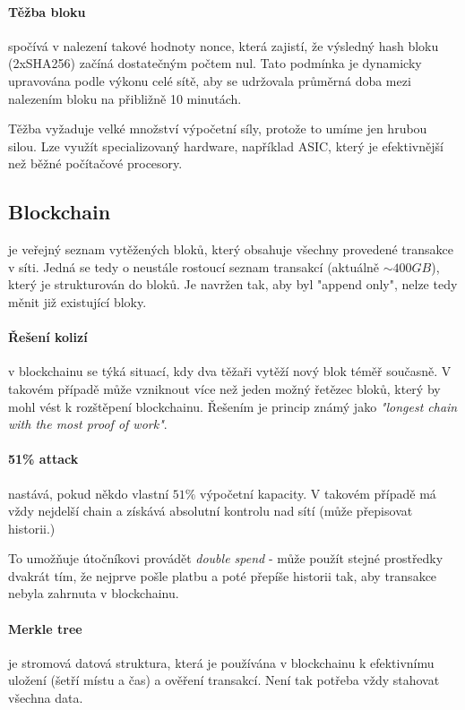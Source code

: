 \documentclass[10pt,a4paper]{article}
\begin{document}
\paragraph{Těžba bloku}
spočívá v nalezení takové hodnoty nonce, která zajistí, že výsledný hash bloku (2xSHA256) začíná dostatečným počtem nul. Tato podmínka je dynamicky upravována podle výkonu celé sítě, aby se udržovala průměrná doba mezi nalezením bloku na přibližně 10 minutách.

Těžba vyžaduje velké množství výpočetní síly, protože to umíme jen hrubou silou.
Lze využít specializovaný hardware, například ASIC, který je efektivnější než běžné počítačové procesory.

\subsection{Blockchain} je veřejný seznam vytěžených bloků, který obsahuje všechny provedené transakce v síti. 
Jedná se tedy o neustále rostoucí seznam transakcí (aktuálně $\sim 400 GB$), který je strukturován do bloků. 
Je navržen tak, aby byl "append only", nelze tedy měnit již existující bloky.

\paragraph{Řešení kolizí} v blockchainu se týká situací, kdy dva těžaři vytěží nový blok téměř současně. 
V takovém případě může vzniknout více než jeden možný řetězec bloků, který by mohl vést k rozštěpení blockchainu. 
Řešením je princip známý jako \textit{"longest chain with the most proof of work"}. 

\paragraph{51\% attack} nastává, pokud někdo vlastní $51\%$ výpočetní kapacity. 
V takovém případě má vždy nejdelší chain a získává absolutní kontrolu nad sítí (může přepisovat historii.)

To umožňuje útočníkovi provádět \textit{double spend} - může použít stejné prostředky dvakrát tím, že nejprve pošle platbu a poté přepíše historii tak, aby transakce nebyla zahrnuta v blockchainu.

\paragraph{Merkle tree} je stromová datová struktura, která je používána v blockchainu k efektivnímu uložení (šetří místu a čas) a ověření transakcí. Není tak potřeba vždy stahovat všechna data.
\end{document}

